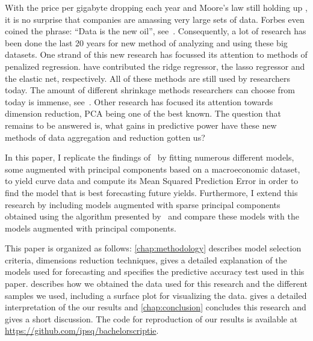 With the price per gigabyte dropping each year and Moore's law still holding up \parencite{schaller_moores_1997}, it is no surprise that companies are amassing very large sets of data. Forbes even coined the phrase: \enquote{Data is the new oil}, see~\textcite{bhageshpur_council_2019}. Consequently, a lot of research has been done the last 20 years for new method of analyzing and using these big datasets. One strand of this new research has focussed its attention to methods of penalized regression. \Textcite{bell_solutions_1978,tibshirani_regression_1996,zou_regularization_2005} have contributed the ridge regressor, the lasso regressor and the elastic net, respectively. All of these methods are still used by researchers today. The amount of different shrinkage methods researchers can choose from today is immense, see~\textcite{bai_forecasting_2008,bai_boosting_2009,schumacher_factor_2010,stock_generalized_2012,kim_forecasting_2014,kim_mining_2018,hirano_forecasting_2017}. Other research has focused its attention towards dimension reduction, PCA being one of the best known. The question that remains to be answered is, what gains in predictive power have these new methods of data aggregation and reduction gotten us? 

In this paper, I replicate the findings of~\textcite{swanson_big_2017} by fitting numerous different models, some augmented with principal components based on a macroeconomic dataset, to yield curve data and compute its Mean Squared Prediction Error in order to find the model that is best forecasting future yields. Furthermore, I extend this research by including models augmented with sparse principal components obtained using the algorithm presented by~\textcite{zou_sparse_2006} and compare these models with the models augmented with principal components. 

This paper is organized as follows: \cref{chap:methodology} describes model selection criteria, dimensions reduction techniques, gives a detailed explanation of the models used for forecasting and specifies the predictive accuracy test used in this paper.  describes how we obtained the data used for this research and the different samples we used, including a surface plot for visualizing the data.  gives a detailed interpretation of the our results and \cref{chap:conclusion} concludes this research and gives a short discussion. The code for reproduction of our results is available at \url{https://github.com/ipsq/bachelorscriptie}. 